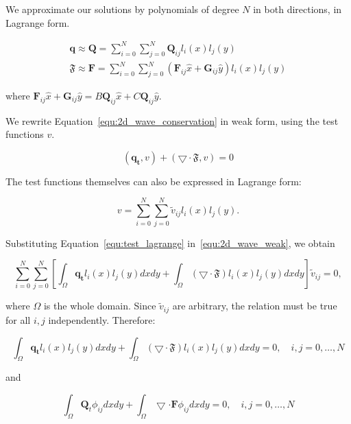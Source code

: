 We approximate our solutions by polynomials of degree \(N\) in both directions, in Lagrange
form. 

\begin{gather}
	\mathbf{q} \approx \mathbf{Q} = \sum_{i = 0}^{N}\sum_{j = 0}^{N}\mathbf{Q}_{i j}l_i(x)l_j(y) \\
	\mathfrak{F} \approx \mathbf{F} = \sum_{i = 0}^{N} \sum_{j = 0}^{N} \left ( \mathbf{F}_{i j} \widehat{x} + \mathbf{G}_{i j}\widehat{y}\right ) l_i(x) l_j(y)
\end{gather}

where \(\mathbf{F}_{i j} \widehat{x} + \mathbf{G}_{i j}\widehat{y} = B \mathbf{Q}_{i j}\widehat{x}
+ C \mathbf{Q}_{i j}\widehat{y}\). 

We rewrite Equation~\ref{equ:2d_wave_conservation} in weak form, using the test functions \(v\).

\begin{equation} \label{equ:2d_wave_weak}
	\left( \mathbf{q_t}, v \right) + \left( \bigtriangledown \cdot \mathfrak{F}, v \right) = 0
\end{equation}

The test functions themselves can also be expressed in Lagrange form:

\begin{equation} \label{equ:test_lagrange}
	v = \sum^{N}_{i = 0}\sum_{j = 0}^{N}\widetilde{v}_{i j}l_i(x)l_j(y).
\end{equation}

Substituting Equation~\ref{equ:test_lagrange} in~\ref{equ:2d_wave_weak}, we obtain

\begin{equation}
	\sum_{i = 0}^{N}\sum_{j = 0}^{N} \left[ \int_{\Omega }\mathbf{q_t} l_i(x) l_j(y) dx dy + \int_{\Omega } \left( \bigtriangledown \cdot \mathfrak{F} \right) l_i(x) l_j(y) dx dy \right] \widetilde{v}_{i j} = 0,
\end{equation}

\noindent
where \(\Omega \) is the whole domain. Since \(\widetilde{v}_{i j}\) are arbitrary, the relation
must be true for all \(i,j\) independently. Therefore:

\begin{equation}
    \int_{\Omega} \mathbf{q_t} l_i(x) l_j(y) dx dy + \int_{\Omega } \left( \bigtriangledown \cdot \mathfrak{F} \right) l_i(x) l_j(y) dx dy = 0, \quad i,j = 0, \ldots, N
\end{equation}

\noindent
and

\begin{equation} %
    \int_{\Omega} \mathbf{Q}_t \phi_{i j} dx dy
    + \int _{\Omega} \bigtriangledown \cdot \mathbf{F} \phi_{i j} dx dy = 0, \quad i,j = 0, \ldots, N \label{equ:2d_wave_test}
\end{equation}

